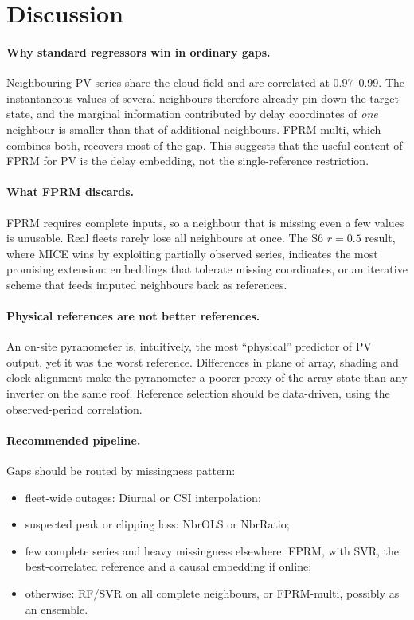 \documentclass[11pt,a4paper]{article}
\begin{document}
\section{Discussion}\label{sec:discussion}

\paragraph{Why standard regressors win in ordinary gaps.}
Neighbouring PV series share the cloud field and are correlated at 0.97--0.99.
The instantaneous values of several neighbours therefore already pin down the target state, and the marginal information contributed by delay coordinates of \emph{one} neighbour is smaller than that of additional neighbours.
FPRM-multi, which combines both, recovers most of the gap.
This suggests that the useful content of FPRM for PV is the delay embedding, not the single-reference restriction.

\paragraph{What FPRM discards.}
FPRM requires complete inputs, so a neighbour that is missing even a few values is unusable.
Real fleets rarely lose all neighbours at once.
The S6 $r=0.5$ result, where MICE wins by exploiting partially observed series, indicates the most promising extension: embeddings that tolerate missing coordinates, or an iterative scheme that feeds imputed neighbours back as references.

\paragraph{Physical references are not better references.}
An on-site pyranometer is, intuitively, the most ``physical'' predictor of PV output, yet it was the worst reference.
Differences in plane of array, shading and clock alignment make the pyranometer a poorer proxy of the array state than any inverter on the same roof.
Reference selection should be data-driven, using the observed-period correlation.

\paragraph{Recommended pipeline.}
Gaps should be routed by missingness pattern:
\begin{itemize}
  \item fleet-wide outages: Diurnal or CSI interpolation;
  \item suspected peak or clipping loss: NbrOLS or NbrRatio;
  \item few complete series and heavy missingness elsewhere: FPRM, with SVR, the best-correlated reference and a causal embedding if online;
  \item otherwise: RF/SVR on all complete neighbours, or FPRM-multi, possibly as an ensemble.
\end{itemize}
\end{document}
